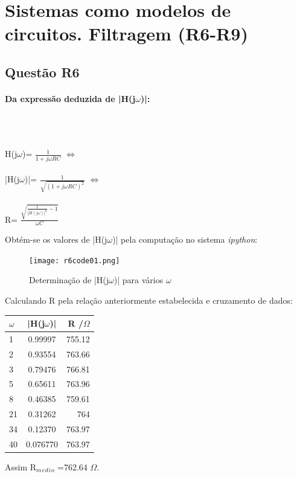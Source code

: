 \documentclass[a4paper,12pt]{article}
\begin{document}
	\section{Sistemas como modelos de circuitos. Filtragem (R6-R9)}
		\subsection{Questão R6}
			\paragraph{Da expressão deduzida de |H(j$\omega$)|:} \mbox{}\\ \mbox{} \\
			\begin{center}
				H(j$\omega$)= $\frac{1}{1+j\omega RC}$ $\iff$ \\ \mbox{}\\
				|H(j$\omega$)|= $\frac{1}{\sqrt{(1+j\omega RC)^{2}}}$ $\iff$\\ \mbox{}\\
				R= $\frac{\sqrt{\frac{1}{|H(j\omega)|^{2}}-1}}{\omega C}$
			\end{center}
			Obtém-se os valores de |H(j$\omega$)| pela computação no sistema \textit{ipython}:
			\begin{figure}[H]
                        	\centering
                                \captionsetup{justification=centering}
                        	\texttt{[image: r6code01.png]}
				\caption{Determinação de |H(j$\omega$)| para vários $\omega$}
          			\end{figure}
			  Calculando R pela relação anteriormente estabelecida e cruzamento de dados:\\
			\begin{center}
			  \begin{tabular}{||l|c|r||}
    				\cline{1-10}
    					$\omega$ & |H(j$\omega$)| & R /$\Omega$  \\
    				\hline \hline
    					1 & 0.99997 &  755.12 \\
    				\hline
    					2 & 0.93554 & 763.66 \\
    				\hline
    					3 & 0.79476 & 766.81 \\
				\hline
                                	5 & 0.65611 &  763.96 \\
				\hline
                                	8 & 0.46385 & 759.61\\
				\hline
                                	21 & 0.31262 & 764 \\
				\hline
                                	34 & 0.12370 & 763.97  \\
				\hline
                                	40 & 0.076770 & 763.97 \\
				\cline{11-11}
			\end{tabular}
		       \end{center}
			Assim R$_m$$_e$$_d$$_i$$_o$ =762.64 $\Omega$.
			\newpage
\end{document}
